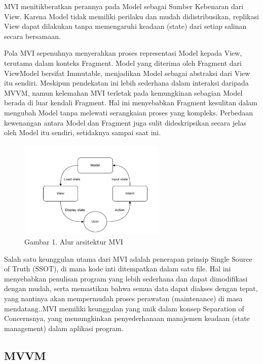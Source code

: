 \documentclass[conference]{IEEEtran}
\begin{document}
\indent MVI menitikberatkan perannya pada Model sebagai Sumber Kebenaran dari View. Karena Model tidak memiliki perilaku dan mudah didistribusikan\cite{anhar2024analisis}, replikasi View dapat dilakukan tanpa memengaruhi keadaan (state) dari setiap salinan secara bersamaan.

\indent Pola MVI sepenuhnya menyerahkan proses representasi Model kepada View, terutama dalam konteks Fragment. Model yang diterima oleh Fragment dari ViewModel bersifat Immutable, menjadikan Model sebagai abstraksi dari View itu sendiri\cite{nunkesser2023choosing}. Meskipun pendekatan ini lebih sederhana dalam interaksi daripada MVVM, namun kelemahan MVI terletak pada kemungkinan sebagian Model berada di luar kendali Fragment. Hal ini menyebabkan Fragment kesulitan dalam mengubah Model tanpa melewati serangkaian proses yang kompleks. Perbedaan kewenangan antara Model dan Fragment juga sulit dideskripsikan secara jelas oleh Model itu sendiri, setidaknya sampai saat ini.

\begin{figure}[htp]
    \centering
    \includegraphics[width=7cm]{image/MVI.png}
    \caption{Gambar 1. Alur arsitektur MVI}
    \label{fig:mvi}
\end{figure}

\indent Salah satu keunggulan utama dari MVI adalah penerapan prinsip Single Source of Truth (SSOT), di mana kode inti ditempatkan dalam satu file. Hal ini menyebabkan penulisan program yang lebih sederhana dan dapat dimodifikasi dengan mudah, serta memastikan bahwa semua data dapat diakses dengan tepat, yang nantinya akan mempermudah proses perawatan (maintenance) di masa mendatang.\cite{arif2021optimasi}.MVI memiliki keunggulan yang unik dalam konsep Separation of Concernsnya, yang memungkinkan penyederhanaan manajemen keadaan (state management) dalam aplikasi program.

\subsection{MVVM}
\end{document}
